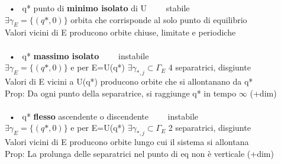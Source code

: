 \documentclass{article}
\theoremstyle{unnumbered}
\theoremstyle{unnumbered1}
\begin{document}
%
%
\ • \ q* punto di \textbf{minimo isolato} di U \ \ \ \ stabile\\
\phantom{\ • }$\exists \gamma_E=\{(q*,0)\}$ orbita che corrisponde al solo punto di equilibrio\\
\phantom{\ • }Valori vicini di E producono orbite chiuse, limitate e periodiche \\ \\
%
%
\ • \ q* \textbf{massimo isolato} \ \ \ \ instabile\\
\phantom{\ • }$\exists \gamma_E=\{(q*,0)\}$ e per E=U(q*) $\exists\gamma_{*,j}\subset\Gamma_E$ 4 separatrici, disgiunte\\
\phantom{\ • }Valori di E vicini a U(q*) producono orbite che si allontanano da q*\\
Prop: Da ogni punto della separatrice, si raggiunge q* in tempo $\infty$ (+dim)\\ \\
%
\ • \ q* \textbf{flesso} ascendente o discendente \ \ \ \ instabile\\
\phantom{\ • }$\exists \gamma_E=\{(q*,0)\}$ e  per E=U(q*) $\exists \gamma_{*,j}\subset\Gamma_E$ 2 separatrici, disgiunte\\
\phantom{\ • }Valori vicini di E producono orbite lungo cui il sistema si allontana\\
Prop: La prolunga delle separatrici nel punto di eq non è verticale (+dim)\\
\end{document}
